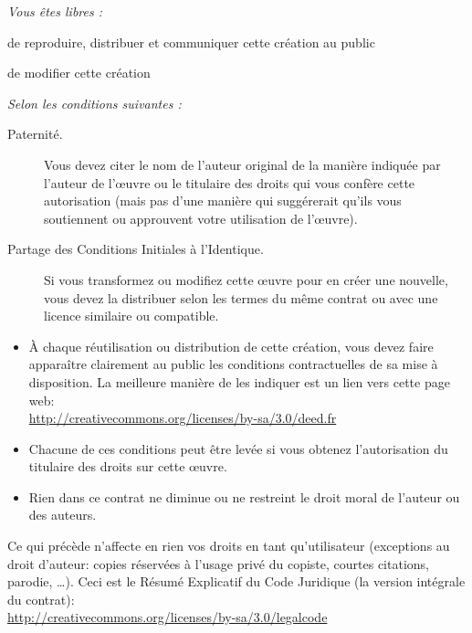 \documentclass[a4paper,10pt,twoside]{book}
\begin{document}
\begin{footnotesize}
\emph{Vous \^etes libres :}
\begin{description}
  \item de reproduire, distribuer et communiquer cette cr\'eation au public
  \item de modifier cette cr\'eation
\end{description}
\emph{Selon les conditions suivantes :}
\begin{description}
  \item[Paternit\'e.] Vous devez citer le nom de l'auteur original de la mani\`ere indiqu\'ee par l'auteur de l'\oe{}uvre ou le titulaire des droits qui vous conf\`ere cette autorisation (mais pas d'une mani\`ere qui sugg\'ererait qu'ils vous soutiennent ou approuvent votre utilisation de l'\oe{}uvre).
  \item[Partage des Conditions Initiales \`a l'Identique.] Si vous transformez ou modifiez cette \oe{}uvre pour en cr\'eer une nouvelle, vous devez la distribuer selon les termes du m\^eme contrat ou avec une licence similaire ou compatible.
\end{description}
\begin{itemize}
  \item \`A chaque r\'eutilisation ou distribution de cette cr\'eation, vous devez faire appara\^itre clairement au public les conditions contractuelles de sa mise \`a disposition. La meilleure mani\`ere de les indiquer est un lien vers cette page web:\\
  \url{http://creativecommons.org/licenses/by-sa/3.0/deed.fr}
  \item Chacune de ces conditions peut \^etre lev\'ee si vous obtenez l'autorisation du titulaire des droits sur cette \oe{}uvre.
  \item Rien dans ce contrat ne diminue ou ne restreint le droit moral de l'auteur ou des auteurs.
\end{itemize}
\quad
\parbox{\textwidth-2cm-1em}{
	Ce qui pr\'ec\`ede n'affecte en rien vos droits en tant qu'utilisateur (exceptions au droit d'auteur: copies r\'eserv\'ees \`a l'usage priv\'e du copiste, courtes citations, parodie, \ldots).
	Ceci est le R\'esum\'e Explicatif du Code Juridique (la version int\'egrale du contrat):\\
\url{http://creativecommons.org/licenses/by-sa/3.0/legalcode}}
\end{footnotesize}
\vfill
\pagestyle{newheadings}
\tableofcontents
\sloppy %

\mainmatter
\end{document}
